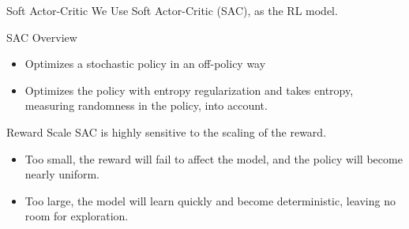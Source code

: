\begin{frame}{Soft Actor-Critic}
We Use Soft Actor-Critic (SAC), as the RL model.
\begin{block}{SAC Overview}
\begin{itemize}
    \item Optimizes a stochastic policy in an off-policy way
    \item Optimizes the policy with \alert{entropy regularization} and takes entropy, measuring randomness in the policy, into account.
\end{itemize}
\end{block}
\begin{alertblock}{Reward Scale}
SAC is highly sensitive to the scaling of the reward. 
\begin{itemize}
    \item Too small, the reward will fail to affect the model, and the policy will become nearly uniform.
    \item Too large, the model will learn quickly and become deterministic, leaving no room for exploration.
\end{itemize}
\end{alertblock}
\end{frame}
